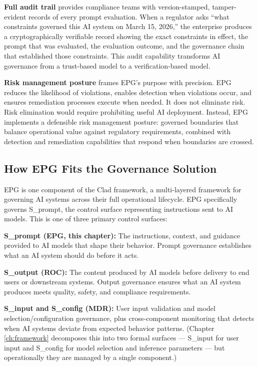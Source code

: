 \textbf{Full audit trail} provides compliance teams with version-stamped, tamper-evident records of every prompt evaluation. When a regulator asks ``what constraints governed this AI system on March 15, 2026,'' the enterprise produces a cryptographically verifiable record showing the exact constraints in effect, the prompt that was evaluated, the evaluation outcome, and the governance chain that established those constraints. This audit capability transforms AI governance from a trust-based model to a verification-based model.

\textbf{Risk management posture} frames EPG's purpose with precision. EPG reduces the likelihood of violations, enables detection when violations occur, and ensures remediation processes execute when needed. It does not eliminate risk. Risk elimination would require prohibiting useful AI deployment. Instead, EPG implements a defensible risk management posture: governed boundaries that balance operational value against regulatory requirements, combined with detection and remediation capabilities that respond when boundaries are crossed.

\subsection{How EPG Fits the Governance Solution}


EPG is one component of the Clad framework, a multi-layered framework for governing AI systems across their full operational lifecycle. EPG specifically governs S\_\allowbreak{}prompt, the control surface representing instructions sent to AI models. This is one of three primary control surfaces:

\textbf{S\_\allowbreak{}prompt (EPG, this chapter):} The instructions, context, and guidance provided to AI models that shape their behavior. Prompt governance establishes what an AI system should do before it acts.

\textbf{S\_\allowbreak{}output (ROC):} The content produced by AI models before delivery to end users or downstream systems. Output governance ensures what an AI system produces meets quality, safety, and compliance requirements.

\textbf{S\_\allowbreak{}input and S\_\allowbreak{}config (MDR):} User input validation and model selection/configuration governance, plus cross-component monitoring that detects when AI systems deviate from expected behavior patterns. (Chapter \ref{ch:framework} decomposes this into two formal surfaces --- S\_\allowbreak{}input for user input and S\_\allowbreak{}config for model selection and inference parameters --- but operationally they are managed by a single component.)

